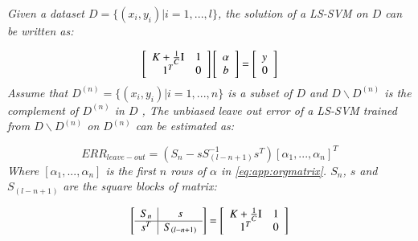 \begin{theorem}

\textit{Given a dataset $D=\{(x_i,y_i)|i=1,...,l\}$, the solution of a LS-SVM on $D$ can be written as:}
	
	\begin{equation}\label{eq:app:orgmatrix}
	\left[ {\begin{array}{*{20}{c}}
		{K  + \frac{1}{C}{\rm I}}\\
		1^T
		\end{array}\begin{array}{*{20}{c}}
		1\\
		0
		\end{array}} \right]\left[ {\begin{array}{*{20}{c}}
		\alpha \\
		b
		\end{array}} \right] = \left[ \begin{array}{l}
	y\\
	0
	\end{array} \right]
	\end{equation}
	\textit{Assume that $D^{(n)} = \{(x_i,y_i)|i=1,...,n\}$ is a subset of $D$ and $D\backslash D^{(n)}$ is the complement of $D^{(n)}$ in $D$ , The unbiased leave out error of a LS-SVM trained from $D\backslash D^{(n)}$ on $D^{(n)}$ can be estimated as:}
	
	\begin{equation*}%
	ERR_{leave-out} = \left( {{S_n} - sS_{(l - n + 1)}^{ - 1}{s^T}} \right){\left[ {{\alpha _1},...,{\alpha _n}} \right]^T}
	\end{equation*}
	\textit{Where $\left[\alpha_1,...,\alpha_n\right]$ is the first $n$ rows of $\alpha$ in \eqref{eq:app:orgmatrix}. $S_n$, $s$ and $S_{(l - n + 1)}$ are the square blocks of matrix:}
	
	\begin{equation*}
	\left[ {\begin{array}{c|c}
		{{S_{n }}} &s\\ \hline
		{{s^T}}&{{S_{(l - n + 1)}}}
		\end{array}} \right] =\left[ {\begin{array}{*{20}{c}}
		{K  + \frac{1}{C}{\rm I}}\\
		1^T
		\end{array}\begin{array}{*{20}{c}}
		1\\
		0
		\end{array}} \right]
	\end{equation*}
\end{theorem}
